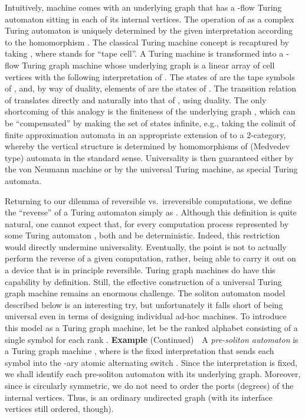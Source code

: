 \documentclass{eptcs}
\begin{document}
Intuitively, machine  comes with an underlying graph  that has a -flow Turing 
automaton sitting in each of its internal vertices. The operation of  as a complex
Turing automaton is uniquely determined by the given interpretation according to the homomorphism
. The classical Turing machine concept is recaptured by taking , where  stands for ``tape cell''. A Turing machine  is 
transformed into a -flow Turing graph machine  whose underlying graph is a linear
array of cell vertices with the following interpretation  of . The states of  are
the tape symbols of , and, by way of duality, elements of  are the states of .
The transition relation of  translates directly and naturally into that of ,
using duality. The only shortcoming of this
analogy is the finiteness of the underlying graph , which can be ``compensated'' by
making the set of states  infinite, e.g., taking the colimit of finite approximation
automata in an appropriate extension of  to a 2-category, whereby the
vertical structure is determined by homomorphisms of (Medvedev type) automata
in the standard sense.  Universality is then guaranteed either by the von Neumann machine
 or by the universal Turing machine, as special Turing automata.

Returning to our dilemma of reversible vs.\ irreversible computations, we define the
``reverse'' of a Turing automaton  simply as .
Although this definition is quite natural, one cannot expect that, for every computation
process represented by some Turing automaton , both  and  be deterministic.
Indeed, this restriction would directly undermine universality. Eventually,
the point is not to actually perform the reverse of a given computation,
rather, being able to carry it out on a device that is in principle 
reversible. Turing graph machines do have this capability by definition.
Still, the effective construction of a universal Turing graph
machine remains an enormous challenge. The soliton automaton model described
below is an interesting try, but unfortunately it falls short of being universal
even in terms of designing individual ad-hoc machines.
To introduce this model as a Turing graph machine, let  be the
ranked alphabet consisting of a single symbol  for each rank .
\vspp\newline
{\bf Example} (Continued)\ \   A {\em pre-soliton automaton\/} is a Turing graph
machine , where  is the fixed interpretation
that sends each symbol  into the -ary atomic alternating 
switch . 
Since the interpretation is fixed, we shall
identify each pre-soliton automaton with its underlying graph. Moreover, since
 is circularly symmetric, we do not need to
order the ports (degrees) of the internal vertices. Thus,  is an ordinary undirected
graph (with its interface vertices still ordered, though). 
\vsp
\end{document}
